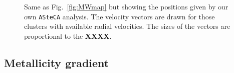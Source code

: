 \documentclass[draft]{aa}
\begin{document}
  \begin{figure}
   \caption{Same as Fig.~\ref{fig:MWmap} but showing the positions given by our
   own \texttt{ASteCA} analysis. The velocity vectors are drawn for those
   clusters with available radial velocities. The sizes of the vectors are
   proportional to the \textbf{XXXX}.}
   \label{fig:MWmap_vectors}
  \end{figure}






 \subsection{Metallicity gradient}
  \label{ssec:met_gradient}

\end{document}
